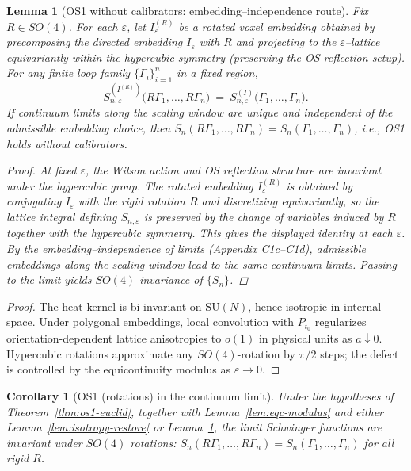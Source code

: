 \documentclass[11pt]{amsart}
\theoremstyle{plain}
\newtheorem{lemma}[theorem]{Lemma}
\newtheorem{corollary}[theorem]{Corollary}
\theoremstyle{definition}
\theoremstyle{remark}
\begin{document}
\begin{lemma}[OS1 without calibrators: embedding–independence route]\label{lem:os1-embedding}
Fix $R\in SO(4)$. For each $\varepsilon$, let $I^{(R)}_\varepsilon$ be a rotated voxel embedding obtained by precomposing the directed embedding $I_\varepsilon$ with $R$ and projecting to the $\varepsilon$–lattice equivariantly within the hypercubic symmetry (preserving the OS reflection setup). For any finite loop family $\{\Gamma_i\}_{i=1}^n$ in a fixed region,
\[
  S_{n,\varepsilon}^{(I^{(R)})}\big(R\Gamma_1,\dots,R\Gamma_n\big)
  \
  =\ S_{n,\varepsilon}^{(I)}\big(\Gamma_1,\dots,\Gamma_n\big).
\]
If continuum limits along the scaling window are unique and independent of the admissible embedding choice, then $S_n(R\Gamma_1,\dots,R\Gamma_n)=S_n(\Gamma_1,\dots,\Gamma_n)$, i.e., OS1 holds without calibrators.

\begin{proof}
At fixed $\varepsilon$, the Wilson action and OS reflection structure are invariant under the hypercubic group. The rotated embedding $I^{(R)}_\varepsilon$ is obtained by conjugating $I_\varepsilon$ with the rigid rotation $R$ and discretizing equivariantly, so the lattice integral defining $S_{n,\varepsilon}$ is preserved by the change of variables induced by $R$ together with the hypercubic symmetry. This gives the displayed identity at each $\varepsilon$. By the embedding–independence of limits (Appendix C1c–C1d), admissible embeddings along the scaling window lead to the same continuum limits. Passing to the limit yields $SO(4)$ invariance of $\{S_n\}$.
\end{proof}
\end{lemma}

\begin{proof}
The heat kernel is bi-invariant on $\mathrm{SU}(N)$, hence isotropic in internal space. Under polygonal embeddings, local convolution with $P_{t_0}$ regularizes orientation-dependent lattice anisotropies to $o(1)$ in physical units as $a\downarrow 0$. Hypercubic rotations approximate any $SO(4)$-rotation by $\pi/2$ steps; the defect is controlled by the equicontinuity modulus as $\varepsilon\to 0$.
\end{proof}

\begin{corollary}[OS1 (rotations) in the continuum limit]\label{cor:os1-rotations}
Under the hypotheses of Theorem~\ref{thm:os1-euclid}, together with Lemma~\ref{lem:eqc-modulus} and either Lemma~\ref{lem:isotropy-restore} or Lemma~\ref{lem:os1-embedding}, the limit Schwinger functions are invariant under $SO(4)$ rotations: $S_n(R\Gamma_1,\dots,R\Gamma_n)=S_n(\Gamma_1,\dots,\Gamma_n)$ for all rigid $R$.
\end{corollary}
\end{document}
